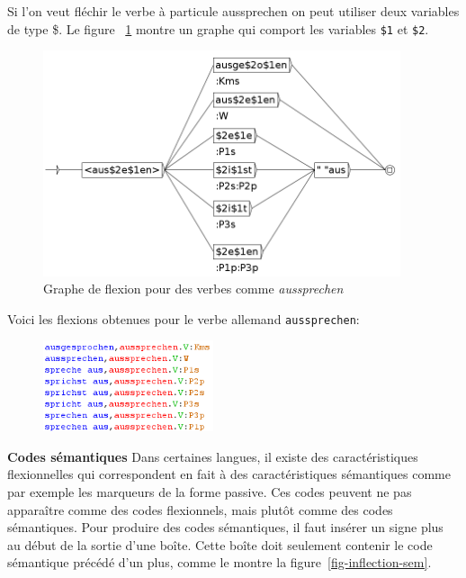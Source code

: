 \noindent Si l'on veut fléchir le verbe à particule aussprechen on peut utiliser deux variables de type \$.
Le figure ~\ref{fig-inflection-aussprechen} montre un graphe qui comport les variables \verb+$1+ et \verb+$2+.

\bigskip
\begin{figure}[!ht]
\begin{center}
\includegraphics[width=10.5cm]{resources/img/fig3-Advanced_operators_with_Variables-V_aussprechen.png}
\caption{Graphe de flexion pour des verbes comme {\it aussprechen}
\label{fig-inflection-aussprechen}}
\end{center}
\end{figure}

\noindent Voici les flexions obtenues pour le verbe allemand \verb+aussprechen+:
\bigskip
\begin{figure}[!ht]
\begin{center}
\includegraphics[width=5cm]{resources/img/fig3-flexion_aussprechen2.png}
\end{center}
\end{figure}

\bigskip
\noindent \textbf{Codes sémantiques}
\noindent Dans certaines langues, il existe des caractéristiques flexionnelles qui correspondent
en fait à des caractéristiques sémantiques comme par exemple les marqueurs de la forme passive.
Ces codes peuvent ne pas apparaître comme des codes flexionnels, mais plutôt comme des codes
sémantiques. Pour produire des codes sémantiques, il faut insérer un signe plus au début de la
sortie d'une boîte. Cette boîte doit seulement contenir le code sémantique précédé d'un plus, comme
le montre la figure~\ref{fig-inflection-sem}.

